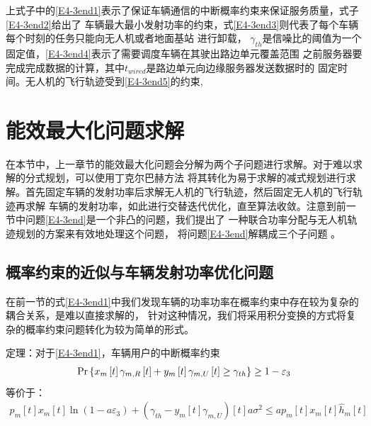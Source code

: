 上式子中的\eqref{E4-3end1}表示了保证车辆通信的中断概率约束来保证服务质量，式子\eqref{E4-3end2}给出了
车辆最大最小发射功率的约束，式\eqref{E4-3end3}则代表了每个车辆每个时刻的任务只能向无人机或者地面基站
进行卸载，
 $\gamma_{th}$是信噪比的阈值为一个固定值，\eqref{E4-3end4}表示了需要调度车辆在其驶出路边单元覆盖范围
之前服务器要完成完成数据的计算，其中$t_{wired}$是路边单元向边缘服务器发送数据时的
固定时间。无人机的飞行轨迹受到\eqref{E4-3end5}的约束,


\section{能效最大化问题求解}\label{section4-3}
在本节中，上一章节的能效最大化问题会分解为两个子问题进行求解。对于难以求解的分式规划，可以使用丁克尔巴赫方法
将其转化为易于求解的减式规划进行求解。首先固定车辆的发射功率后求解无人机的飞行轨迹，然后固定无人机的飞行轨迹再求解
车辆的发射功率，如此进行交替迭代优化，直至算法收敛。注意到前一节中问题\eqref{E4-3end}是一个非凸的问题，我们提出了
一种联合功率分配与无人机轨迹规划的方案来有效地处理这个问题，
将问题\eqref{E4-3end}解耦成三个子问题 \cite{JointTrajectory9627548}。
\subsection{概率约束的近似与车辆发射功率优化问题}\label{section4-3-1}
在前一节的式\eqref{E4-3end1}中我们发现车辆的功率功率在概率约束中存在较为复杂的耦合关系，是难以直接求解的，
针对这种情况，我们将采用积分变换的方式将复杂的概率约束问题转化为较为简单的形式。

定理：对于\eqref{E4-3end1}，车辆用户的中断概率约束
\begin{align}
\Pr\left\{x_m\left[t\right]\gamma_{m,R}\left[t\right]+y_m\left[t\right]\gamma_{m,U}\left[t\right] \geq \gamma_{th}\right\}\geq1-\varepsilon_3    \notag
\end{align}
等价于：
\begin{equation} \label{E4-14}
\begin{gathered}
p_m\left[t\right]x_m\left[t\right]\ln \left(1-a \varepsilon_3\right)+(\gamma_{th}-y_m\left[t\right]\gamma_{m,U})\left[t\right] a \sigma^2
\leq a p_m\left[t\right]x_m\left[t\right]\hat{h}_{m}\left[t\right]
\end{gathered}
\end{equation}

